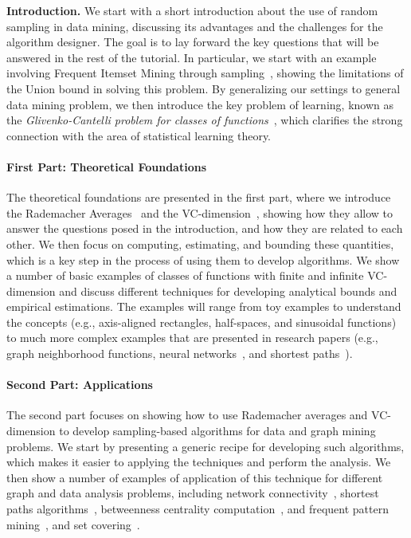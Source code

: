 \documentclass{sig-alternate-2013}
\begin{document}
{\bf Introduction.} We start with a short introduction about the use of random
sampling in data mining, discussing its advantages and the challenges for the
algorithm designer.  The goal is to lay forward the key questions that will be
answered in the rest of the tutorial. In particular, we start with an example
involving Frequent Itemset Mining through
sampling~\citep{RiondatoU14,RiondatoU15}, showing the limitations of the Union
bound in solving this problem. By generalizing our settings to general data
mining problem, we then introduce the key problem of learning, known as the
\emph{Glivenko-Cantelli problem for classes of functions}~\citep{Vapnik99},
which clarifies the strong connection with the area of statistical learning
theory.

\paragraph*{First Part: Theoretical Foundations} 
The theoretical foundations are presented in the first part, where we introduce
the Rademacher Averages~\citep{BoucheronBL05,Koltchinskii01}  and the
VC-dimension~\citep{VapnikC71}, showing how they allow to answer the questions
posed in the introduction, and how they are related to each other.  We then
focus on computing, estimating, and bounding these quantities, which is a key
step in the process of using them to develop algorithms. We show a number of
basic examples of classes of functions with finite and infinite VC-dimension and
discuss different techniques for developing analytical bounds and empirical
estimations. The examples will range from toy examples to understand the
concepts (e.g., axis-aligned rectangles, half-spaces, and sinusoidal functions)
to much more complex examples that are presented in research papers (e.g., graph
neighborhood functions, neural networks~\citep{AnthonyB99}, and shortest
paths~\citep{AbrahamDFGW11}).

\paragraph*{Second Part: Applications}
The second part focuses on showing how to use
Rademacher averages and VC-dimension to develop sampling-based algorithms for
data and graph mining problems. We start by presenting a generic recipe for
developing such algorithms, which makes it easier to applying the techniques and
perform the analysis. We then show a number of examples of application of this
technique for different graph and data analysis problems, including network
connectivity~\citep{KleinbergSS08}, shortest paths
algorithms~\citep{AbrahamDFGW11}, betweenness centrality
computation~\citep{RiondatoK14}, and frequent pattern
mining~\citep{RiondatoU14,RiondatoV14,RiondatoU15}, and set
covering~\citep{BronnimannG95}.
\end{document}
